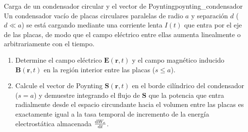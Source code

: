 \documentclass[11pt,a4paper]{book}
\newcommand{\Evec}{\bm{E}}
\newcommand{\Bvec}{\bm{B}}
\newcommand{\Svec}{\bm{S}}
\begin{document}
\begin{ejercicio}{Carga de un condensador circular y el vector de Poynting}{poynting_condensador}
Un condensador vacío de placas circulares paralelas de radio $a$ y separación $d$ ($d \ll a$) se está cargando mediante una corriente lenta $I(t)$ que entra por el eje de las placas, de modo que el campo eléctrico entre ellas aumenta linealmente o arbitrariamente con el tiempo.
\begin{enumerate}[label=\alph*)]
    \item Determine el campo eléctrico $\Evec(\bm{r},t)$ y el campo magnético inducido $\Bvec(\bm{r},t)$ en la región interior entre las placas ($s \le a$).
    \item Calcule el vector de Poynting $\Svec(\bm{r},t)$ en el borde cilíndrico del condensador ($s = a$) y demuestre integrando el flujo de $\Svec$ que la potencia que entra radialmente desde el espacio circundante hacia el volumen entre las placas es exactamente igual a la tasa temporal de incremento de la energía electrostática almacenada $\dv{W_e}{t}$.
\end{enumerate}
\end{ejercicio}
\end{document}
